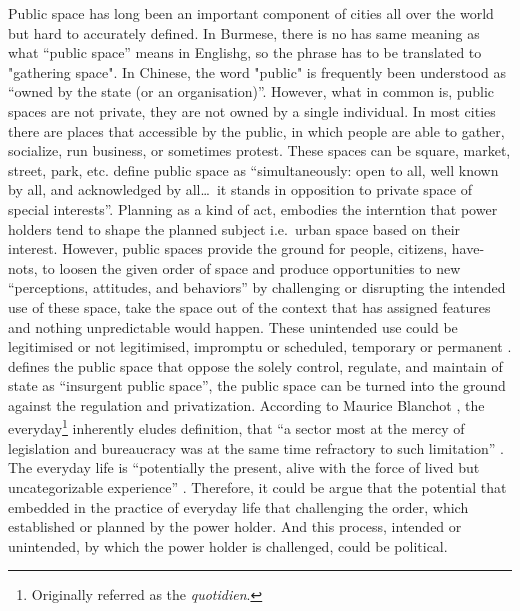 Public space has long been an important component of cities all over the world but hard to accurately defined. In Burmese, there is no has same meaning as what ``public space'' means in Englishg, so the phrase has to be translated to "gathering space". In Chinese, the word "public" is frequently been understood as ``owned by the state (or an organisation)''. However, what in common is, public spaces are not private, they are not owned by a single individual. In most cities there are places that accessible by the public, in which people are able to gather, socialize, run business, or sometimes protest. These spaces can be square, market, street, park, etc. \citet[p.~35]{henaff_public_2001} define public space as ``simultaneously: open to all, well known by all, and acknowledged by all\ldots\ it stands in opposition to private space of special interests''. Planning as a kind of act, embodies the interntion that power holders tend to shape the planned subject i.e.\ urban space based on their interest. However, public spaces provide the ground for people, citizens, have-nots, to loosen the given order of space and produce opportunities to new ``perceptions, attitudes, and behaviors'' \citep[p.~14]{franck_tying_2006} by challenging or disrupting the intended use of these space, take the space out of the context that has assigned features and nothing unpredictable would happen. These unintended use could be legitimised or not legitimised, impromptu or scheduled, temporary or permanent \citep{franck_tying_2006}. \citet{hou_not_2010} defines the public space that oppose the solely control, regulate, and maintain of state as ``insurgent public space'', the public space can be turned into the ground against the regulation and privatization. According to Maurice Blanchot \citep[cited in][]{sheringham_indeterminacy_2006}, the everyday\footnote{Originally referred as the \textit{quotidien}.} inherently eludes definition, that ``a sector most at the mercy of legislation and bureaucracy was at the same time refractory to such limitation'' \citep[p.~18]{sheringham_indeterminacy_2006}. The everyday life is ``potentially the present, alive with the force of lived but uncategorizable experience'' \citep[p.~17]{sheringham_indeterminacy_2006}. Therefore, it could be argue that the potential that embedded in the practice of everyday life that challenging the order, which established or planned by the power holder. And this process, intended or unintended, by which the power holder is challenged, could be political.


